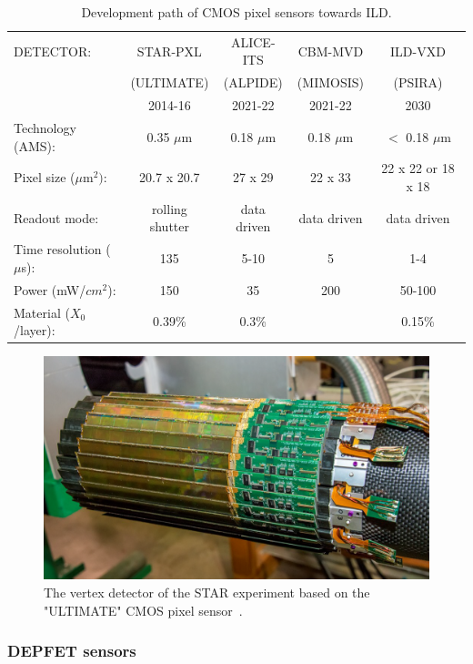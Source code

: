 \begin{table}\hspace*{-0cm}\small
\begin{tabular}{ l c c c c }
\toprule
DETECTOR: & STAR-PXL & ALICE-ITS & CBM-MVD & ILD-VXD \\
& (ULTIMATE) & (ALPIDE) & (MIMOSIS) & (PSIRA) \\
& 2014-16 & 2021-22 & 2021-22   & 2030 \\
\midrule
Technology (AMS): & 0.35 $\mu$m & 0.18 $\mu$m & 0.18 $\mu$m & $<$ 0.18 $\mu$m \\
Pixel size ($\mu$m$^2)$: & 20.7 x 20.7  & 27 x 29 & 22 x 33 & 22 x 22 or 18 x 18 \\
Readout mode:   & rolling shutter & data driven & data driven & data driven \\
Time resolution ($\mu$s):   & 135 & 5-10 & 5 & 1-4 \\
Power (mW/$cm^2$):   & 150 & 35  & 200  & 50-100 \\
Material ($X_0$/layer):   & 0.39\% & 0.3\%  &   & 0.15\% \\
\bottomrule
\end{tabular}
\caption{\label{ild:tab:CMOSdev}Development path of CMOS pixel sensors towards ILD.}
\end{table}



\begin{figure}[t!]
\centering
\includegraphics[width=0.6\hsize]{Detector/fig/VTX_STAR.png}
\caption{The vertex detector of the STAR experiment based on the "ULTIMATE" CMOS pixel sensor~\cite{Contin:2017mck}.}
\label{fig:det:VTX_STAR}
\end{figure}

\subsubsection{DEPFET sensors}

